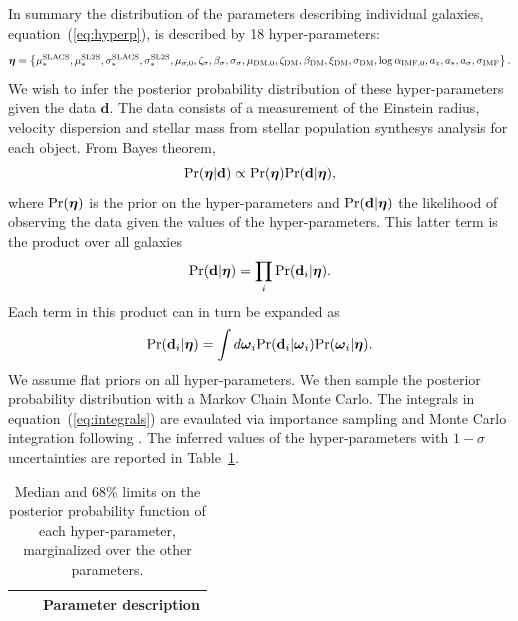 \documentclass[usenatbib]{mnras}
\newcommand{\boldsymbol}[1]{\mbox{\boldmath{${#1}$}}}
\def\pr{{\rm Pr}}
\def\hyperp{\boldsymbol{\eta}}
\def\indpari{\boldsymbol{\omega}_i}
\def\datad{\mathbf{d}}
\def\datadi{\mathbf{d}_i}
\def\Tref#1{Table~\ref{#1}\xspace}
\def\Eref#1{equation~(\ref{#1})\xspace}
\begin{document}
In summary the distribution of the parameters describing individual galaxies, \Eref{eq:hyperp}, is described by 18 hyper-parameters:
\begin{equation}
\hyperp = \left\{\mu_*^{\mathrm{SLACS}}, \mu_*^{\mathrm{SL2S}}, \sigma_*^{\mathrm{SLACS}}, \sigma_*^{\mathrm{SL2S}}, \mu_{\sigma,0}, \zeta_\sigma, \beta_\sigma, \sigma_\sigma, \mu_{\mathrm{DM}, 0}, \zeta_{\mathrm{DM}}, \beta_{\mathrm{DM}}, \xi_{\mathrm{DM}}, \sigma_{\mathrm{DM}}, \log{\alpha_{\mathrm{IMF}, 0}}, a_z, a_*, a_\sigma, \sigma_{\mathrm{IMF}} \right\}.
\end{equation}
We wish to infer the posterior probability distribution of these hyper-parameters given the data $\datad$.
The data consists of a measurement of the Einstein radius, velocity dispersion and stellar mass from stellar population synthesys analysis for each object.
From Bayes theorem, 
\begin{equation}
\pr(\hyperp|\datad) \propto \pr(\hyperp)\pr(\datad|\hyperp),
\end{equation}
where $\pr(\hyperp)$ is the prior on the hyper-parameters and $\pr(\datad|\hyperp)$ the likelihood of observing the data given the values of the hyper-parameters.
This latter term is the product over all galaxies
\begin{equation}
\pr(\datad|\hyperp) = \prod_i \pr(\datadi|\hyperp).
\end{equation}
Each term in this product can in turn be expanded as
\begin{equation}\label{eq:integrals}
\pr(\datadi|\hyperp) = \int d\indpari \pr(\datadi|\indpari) \pr(\indpari|\hyperp).
\end{equation}
We assume flat priors on all hyper-parameters.
We then sample the posterior probability distribution with a Markov Chain Monte Carlo. 
The integrals in \Eref{eq:integrals} are evaulated via importance sampling and Monte Carlo integration following \citet{Sch++15}.
The inferred values of the hyper-parameters with $1-\sigma$ uncertainties are reported in \Tref{tab:hyperp}.
\begin{table}
 \caption{Median and $68\%$ limits on the posterior probability function of each hyper-parameter, marginalized over the other parameters.}
 \label{tab:hyperp}
 \begin{tabular}{lcl}
 \hline
 & & Parameter description \\
 \hline
 
 \hline
 \end{tabular}
\end{table}
\end{document}
